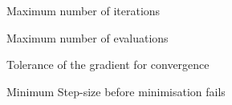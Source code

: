 \subsubsection[Gamma Diff]{}

 {Maximum number of iterations}

 {Maximum number of evaluations}

 {Tolerance of the gradient for convergence}

 {Minimum Step-size before minimisation fails}

